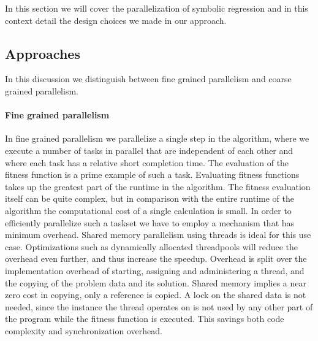 In this section we will cover the parallelization of symbolic regression and in this context detail the design choices we made in our approach.

\subsection{Approaches}
In this discussion we distinguish between fine grained parallelism and coarse grained parallelism. 

\paragraph{Fine grained parallelism}
In fine grained parallelism we parallelize a single step in the algorithm, where we execute a number of tasks in parallel that are independent of each other and where each task has a relative short completion time. 
The evaluation of the fitness function is a prime example of such a task. Evaluating fitness functions takes up the greatest part of the runtime in the algorithm.
The fitness evaluation itself can be quite complex, but in comparison with the entire runtime of the algorithm the computational cost of a single calculation is small. In order to efficiently parallelize such a taskset we have to employ a mechanism that has minimum overhead. Shared memory parallelism using threads is ideal for this use case. Optimizations such as dynamically allocated threadpools will reduce the overhead even further, and thus increase the speedup. Overhead is split over the implementation overhead of starting, assigning and administering a thread, and the copying of the problem data and its solution. Shared memory implies a near zero cost in copying, only a reference is copied. A lock on the shared data is not needed, since the instance the thread operates on is not used by any other part of the program while the fitness function is executed. This savings both code complexity and synchronization overhead.

